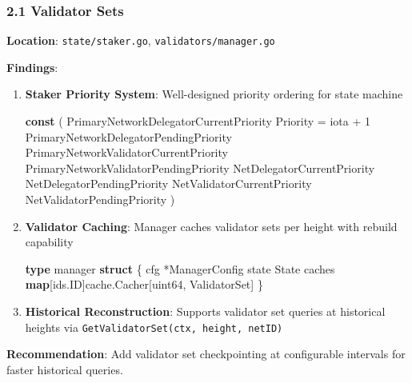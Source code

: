 \documentclass[
]{article}
\newenvironment{Shaded}{}{}
\newcommand{\DataTypeTok}[1]{\textcolor[rgb]{0.56,0.13,0.00}{#1}}
\newcommand{\DecValTok}[1]{\textcolor[rgb]{0.25,0.63,0.44}{#1}}
\newcommand{\KeywordTok}[1]{\textcolor[rgb]{0.00,0.44,0.13}{\textbf{#1}}}
\newcommand{\NormalTok}[1]{#1}
\newcommand{\OperatorTok}[1]{\textcolor[rgb]{0.40,0.40,0.40}{#1}}
\newcommand{\OtherTok}[1]{\textcolor[rgb]{0.00,0.44,0.13}{#1}}
\begin{document}
\subsubsection{2.1 Validator Sets}\label{21-validator-sets}

\textbf{Location}: \texttt{state/staker.go},
\texttt{validators/manager.go}

\textbf{Findings}:

\begin{enumerate}
\def\labelenumi{\arabic{enumi}.}
\item
  \textbf{Staker Priority System}: Well-designed priority ordering for
  state machine

\begin{Shaded}
\begin{Highlighting}[]
\KeywordTok{const} \OperatorTok{(}
\NormalTok{    PrimaryNetworkDelegatorCurrentPriority Priority }\OperatorTok{=} \OtherTok{iota} \OperatorTok{+} \DecValTok{1}
\NormalTok{    PrimaryNetworkDelegatorPendingPriority}
\NormalTok{    PrimaryNetworkValidatorCurrentPriority}
\NormalTok{    PrimaryNetworkValidatorPendingPriority}
\NormalTok{    NetDelegatorCurrentPriority}
\NormalTok{    NetDelegatorPendingPriority}
\NormalTok{    NetValidatorCurrentPriority}
\NormalTok{    NetValidatorPendingPriority}
\OperatorTok{)}
\end{Highlighting}
\end{Shaded}
\item
  \textbf{Validator Caching}: Manager caches validator sets per height
  with rebuild capability

\begin{Shaded}
\begin{Highlighting}[]
\KeywordTok{type}\NormalTok{ manager }\KeywordTok{struct} \OperatorTok{\{}
\NormalTok{    cfg    }\OperatorTok{*}\NormalTok{ManagerConfig}
\NormalTok{    state  State}
\NormalTok{    caches }\KeywordTok{map}\OperatorTok{[}\NormalTok{ids}\OperatorTok{.}\NormalTok{ID}\OperatorTok{]}\NormalTok{cache}\OperatorTok{.}\NormalTok{Cacher}\OperatorTok{[}\DataTypeTok{uint64}\OperatorTok{,}\NormalTok{ ValidatorSet}\OperatorTok{]}
\OperatorTok{\}}
\end{Highlighting}
\end{Shaded}
\item
  \textbf{Historical Reconstruction}: Supports validator set queries at
  historical heights via \texttt{GetValidatorSet(ctx,\ height,\ netID)}
\end{enumerate}

\textbf{Recommendation}: Add validator set checkpointing at configurable
intervals for faster historical queries.
\end{document}
